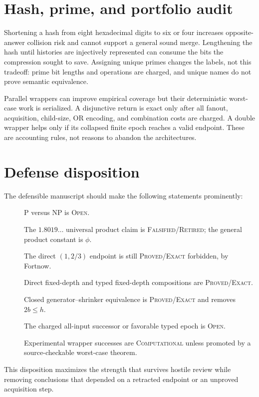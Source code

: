 \documentclass[11pt]{article}
\newcommand{\Exact}{\textsc{Proved/Exact}}
\newcommand{\Comp}{\textsc{Computational}}
\newcommand{\Open}{\textsc{Open}}
\newcommand{\Retired}{\textsc{Falsified/}\allowbreak\textsc{Retired}}
\begin{document}
\section{Hash, prime, and portfolio audit}

Shortening a hash from eight hexadecimal digits to six or four increases
opposite-answer collision risk and cannot support a general sound merge.
Lengthening the hash until histories are injectively represented can consume
the bits the compression sought to save.  Assigning unique primes changes
the labels, not this tradeoff: prime bit lengths and operations are charged,
and unique names do not prove semantic equivalence.

Parallel wrappers can improve empirical coverage but their deterministic
worst-case work is serialized.  A disjunctive return is exact only after all
fanout, acquisition, child-size, OR encoding, and combination costs are
charged.  A double wrapper helps only if its collapsed finite epoch reaches a
valid endpoint.  These are accounting rules, not reasons to abandon the
architectures.

\section{Defense disposition}

The defensible manuscript should make the following statements prominently:
\begin{description}
\item[] P versus NP is \Open{}.
\item[] The $1.8019\ldots$ universal product claim is \Retired{}; the general
product constant is $\phi$.
\item[] The direct $(1,2/3)$ endpoint is still \Exact{} forbidden, by
Fortnow.
\item[] Direct fixed-depth and typed fixed-depth compositions are \Exact{}.
\item[] Closed generator--shrinker equivalence is \Exact{} and removes
$2b\le h$.
\item[] The charged all-input successor or favorable typed epoch is \Open{}.
\item[] Experimental wrapper successes are \Comp{} unless promoted by a
source-checkable worst-case theorem.
\end{description}

This disposition maximizes the strength that survives hostile review while
removing conclusions that depended on a retracted endpoint or an unproved
acquisition step.



\end{document}

